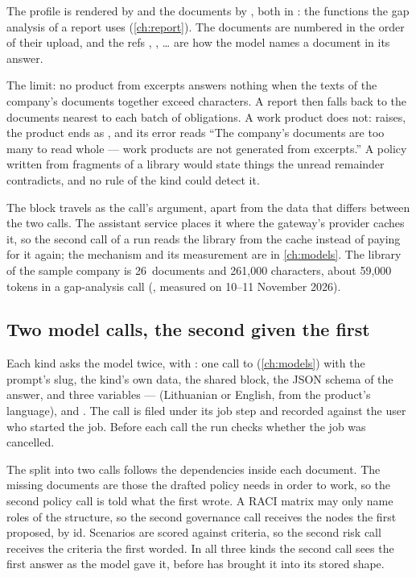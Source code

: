 The profile is rendered by  and the documents by
, both in : the functions the gap analysis of
a report uses (\cref{ch:report}). The documents are numbered in the order of their upload, and
the refs , , … are how the model names a document in its answer.

\begin{codebox}{The limit: no product from excerpts}
 answers nothing when the texts of the company's documents together
exceed  characters. A report then falls back to the
documents nearest to each batch of obligations. A work product does not: 
raises, the product ends as , and its error reads \enquote{The company's
documents are too many to read whole --- work products are not generated from excerpts.} A
policy written from fragments of a library would state things the unread remainder
contradicts, and no rule of the kind could detect it.
\end{codebox}

The block travels as the call's  argument, apart from the data that differs
between the two calls. The assistant service places it where the gateway's provider caches
it, so the second call of a run reads the library from the cache instead of paying for it
again; the mechanism and its measurement are in \cref{ch:models}. The library of the sample
company \demo{} is 26~documents and 261,000 characters, about 59,000 tokens in a gap-analysis
call (, measured on 10--11 November 2026).

\subsection{Two model calls, the second given the first}

Each kind asks the model twice, with : one call to 
(\cref{ch:models}) with the prompt's slug, the kind's own data, the shared block, the JSON
schema of the answer, and three variables ---  (Lithuanian or English, from the
product's language),  and . The call is filed under its job
step and recorded against the user who started the job. Before each call the run checks
whether the job was cancelled.

The split into two calls follows the dependencies inside each document. The missing documents
are those the drafted policy needs in order to work, so the second policy call is told what
the first wrote. A RACI matrix may only name roles of the structure, so the second governance
call receives the nodes the first proposed, by id. Scenarios are scored against criteria, so
the second risk call receives the criteria the first worded. In all three kinds the second
call sees the first answer as the model gave it, before  has brought it into
its stored shape.

